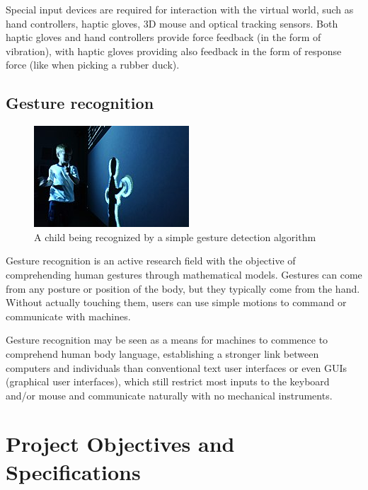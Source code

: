 \documentclass[12pt,a4paper,twoside]{report}
\begin{document}
Special input devices are required for interaction with the virtual world, such as hand controllers, haptic gloves, 3D mouse and optical tracking sensors. Both haptic gloves and hand controllers provide force feedback (in the form of vibration), with haptic gloves providing also feedback in the form of response force (like when picking a rubber duck).

\section{Gesture recognition}

\begin{figure}
  \includegraphics[width=\linewidth]{img/GestRecog_child.jpg}
  \caption{A child being recognized by a simple gesture detection algorithm}
  \label{fig:child}
\end{figure}

Gesture recognition is an active research field with the objective of comprehending human gestures through mathematical models. Gestures can come from any posture or position of the body, but they typically come from the hand. Without actually touching them, users can use simple motions to command or communicate with machines.

Gesture recognition may be seen as a means for machines to commence to comprehend human body language, establishing a stronger link between computers and individuals than conventional text user interfaces or even GUIs (graphical user interfaces), which still restrict most inputs to the keyboard and/or mouse and communicate naturally with no mechanical instruments.

\chapter{Project Objectives and Specifications}
\end{document}
